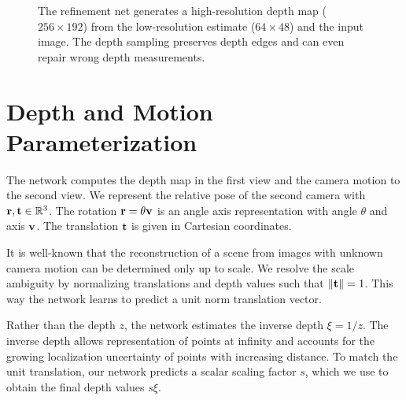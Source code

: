\documentclass[10pt,twocolumn,letterpaper]{article}
\begin{document}
\begin{figure}
\begin{center}
\end{center}
\vspace{\capvspace}%
\caption{%
The refinement net generates a high-resolution depth map ($256\times192$) from the low-resolution estimate ($64\times48$) and the input image.
The depth sampling preserves depth edges and can even repair wrong depth measurements. %
}
\label{fig:refinement_comparison}
\vspace{\figvspace}
\end{figure}



\section{Depth and Motion Parameterization}
\label{sec:parametrization}
The network computes the depth map in the first view and the camera motion to the second view.
We represent the relative pose of the second camera with $\mathbf{r}, \mathbf{t} \in \mathbb R^3$.
The rotation $\mathbf{r} = \theta \mathbf{v}$ is an angle axis representation with angle $\theta$ and axis $\mathbf{v}$.
The translation $\mathbf{t}$ is given in Cartesian coordinates.

It is well-known that the reconstruction of a scene from images with unknown camera motion can be determined only up to scale.
We resolve the scale ambiguity by normalizing translations and depth values such that $\Vert \mathbf{t} \Vert = 1$.
This way the network learns to predict a unit norm translation vector.


Rather than the depth $z$, the network estimates the inverse depth $\xi = 1/z$.
The inverse depth allows representation of points at infinity and accounts for the growing localization uncertainty of points with increasing distance.%
To match the unit translation, our network predicts a scalar scaling factor $s$, which we use to obtain the final depth values $s\xi$.
\end{document}
